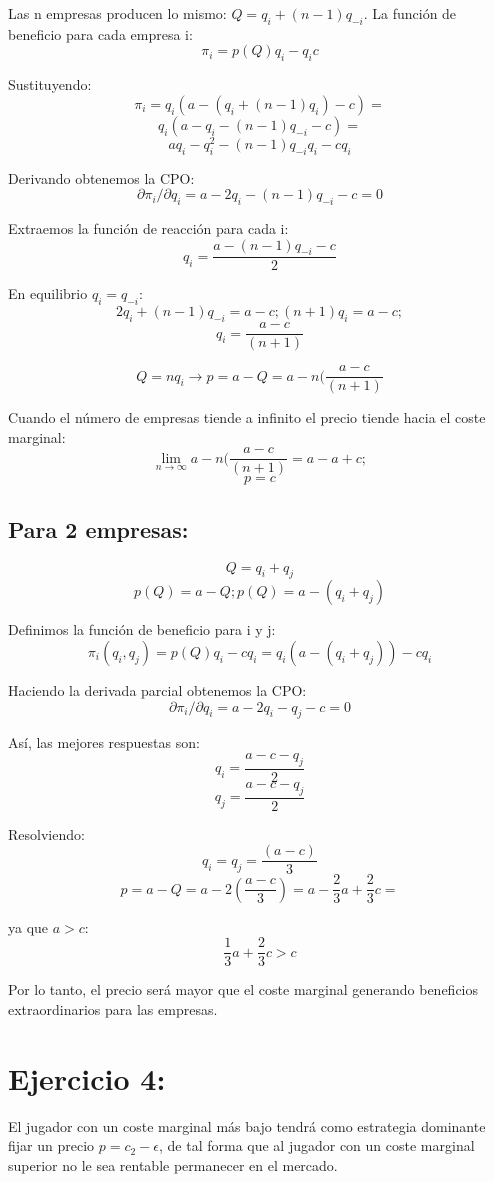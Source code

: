 \documentclass{article}
\begin{document}
Las n empresas producen lo mismo: $Q=q_i+(n-1)q_{-i}$.
                                                                                                                                                                                              La funci\'on de beneficio para cada empresa i:            
$$\pi_i=p(Q)q_i-q_ic$$

Sustituyendo:
$$\pi_i=q_i(a-(q_i+(n-1)q_i)-c)=$$
$$q_i(a-q_i-(n-1)q_{-i}-c)=$$
$$aq_i-q_i^2-(n-1)q_{-i}q_i-cq_i$$

Derivando obtenemos la CPO:
$$\partial \pi_i/\partial q_i= a-2q_i-(n-1)q_{-i}-c=0$$

Extraemos la funci\'on de reacci\'on para cada i:
$$q_i=\frac{a-(n-1)q_{-i}-c}{2}$$

En equilibrio $q_i=q_{-i}$:
$$2q_i+(n-1)q_{-i}=a-c; (n+1)q_i=a-c;$$
$$q_i=\frac{a-c}{(n+1)}$$

$$Q=nq_i \rightarrow p=a-Q=a-n(\frac{a-c}{(n+1)}$$

Cuando el n\'umero de empresas tiende a infinito el precio tiende hacia el coste marginal:
$$\lim_{n\rightarrow \infty}a-n(\frac{a-c}{(n+1)}=a-a+c;$$
$$p=c$$

\subsection{Para 2 empresas:}

$$Q=q_i+q_j$$
$$p(Q)=a-Q; p(Q)=a-(q_i+q_j)$$

Definimos la funci\'on de beneficio para i y j:
$$\pi_i(q_i,q_j)=p(Q)q_i-cq_i=q_i(a-(q_i+q_j))-cq_i$$

Haciendo la derivada parcial obtenemos la CPO:
$$\partial \pi_i/\partial q_i= a-2q_i-q_j-c=0$$

As\'i, las mejores respuestas son:
$$q_i=\frac{a-c-q_j}{2}$$
$$q_j=\frac{a-c-q_j}{2}$$

Resolviendo:
$$q_i=q_j=\frac{(a-c)}{3}$$
$$p=a-Q=a-2(\frac{a-c}{3})=a-\frac{2}{3}a+\frac{2}{3}c=$$

ya que $a>c$:
$$\frac{1}{3}a+\frac{2}{3}c>c$$

Por lo tanto, el precio ser\'a mayor que el coste marginal generando beneficios extraordinarios para las empresas.

\section{Ejercicio 4: }

El jugador con un coste marginal m\'as bajo tendr\'a como estrategia dominante fijar un precio $p=c_2-\epsilon$, de tal forma que al jugador con un coste marginal superior no le sea rentable permanecer en el mercado.
\end{document}
